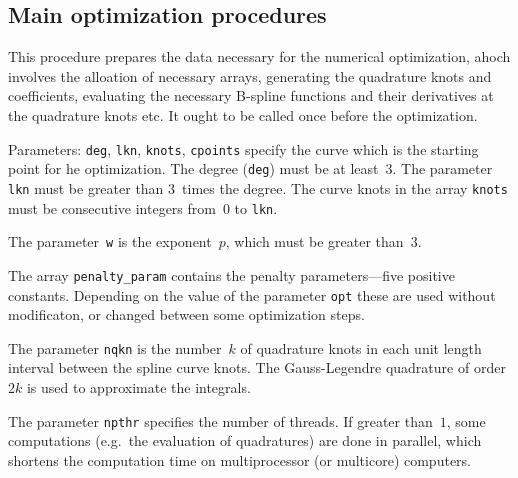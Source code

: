 \subsection{Main optimization procedures}


This procedure prepares the data necessary for the numerical optimization,
ahoch involves the alloation of necessary arrays, generating the quadrature
knots and coefficients, evaluating the necessary B-spline functions and
their derivatives at the quadrature knots etc. It ought to be called once
before the optimization.

Parameters: \texttt{deg}, \texttt{lkn}, \texttt{knots}, \texttt{cpoints}
specify the curve which is the starting point for he optimization. The
degree (\texttt{deg}) must be at least~$3$. The parameter \texttt{lkn} must
be greater than $3$~times the degree. The curve knots in the array \texttt{knots}
must be consecutive integers from~$0$ to \texttt{lkn}.

The parameter~\texttt{w} is the exponent~$p$, which must be greater
than~$3$.

The array \texttt{penalty\_param} contains the penalty parameters---five
positive constants. Depending on the value of the parameter \texttt{opt}
these are used without modificaton, or changed between some optimization
steps.

The parameter \texttt{nqkn} is the number~$k$ of quadrature knots in each unit
length interval between the spline curve knots. The Gauss-Legendre
quadrature of order $2k$ is used to approximate the integrals.

The parameter \texttt{npthr} specifies the number of threads. If greater
than~$1$, some computations (e.g.\ the evaluation of quadratures) are done
in parallel, which shortens the computation time on multiprocessor (or
multicore) computers.

